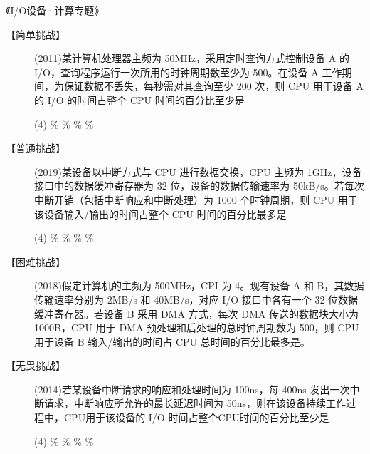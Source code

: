 \documentclass[UTF8]{ctexart}
\begin{document}
{\color{cyan!50!black}
\begin{center}
  《I/O设备·计算专题》
\end{center}


\begin{description}
  \item[【简单挑战】] (2011)某计算机处理器主频为 50MHz，采用定时查询方式控制设备 A 的 I/O，查询程序运行一次所用的时钟周期数至少为 500。在设备 A 工作期间，为保证数据不丢失，每秒需对其查询至少 200 次，则 CPU 用于设备 A 的 I/O 的时间占整个 CPU 时间的百分比至少是
  \begin{tasks}(4)
    \%
    \%
    \%
    \%
  \end{tasks}

  \item[【普通挑战】] (2019)某设备以中断方式与 CPU 进行数据交换，CPU 主频为 1GHz，设备接口中的数据缓冲寄存器为 32 位，设备的数据传输速率为 50kB/s。若每次中断开销（包括中断响应和中断处理）为 1000 个时钟周期，则 CPU 用于该设备输入/输出的时间占整个 CPU 时间的百分比最多是
  \begin{tasks}(4)
    \%
    \%
    \%
    \%
  \end{tasks}

  \item[【困难挑战】] (2018)假定计算机的主频为 500MHz，CPI 为 4。现有设备 A 和 B，其数据传输速率分别为 2MB/s 和 40MB/s，对应 I/O 接口中各有一个 32 位数据缓冲寄存器。若设备 B 采用 DMA 方式，每次 DMA 传送的数据块大小为 1000B，CPU 用于 DMA 预处理和后处理的总时钟周期数为 500，则 CPU 用于设备 B 输入/输出的时间占 CPU 总时间的百分比最多是\underline{\qquad}。

  \item[【无畏挑战】] (2014)若某设备中断请求的响应和处理时间为 100ns，每 400ns 发出一次中断请求，中断响应所允许的最长延迟时间为 50ns，则在该设备持续工作过程中，CPU用于该设备的 I/O 时间占整个CPU时间的百分比至少是
  \begin{tasks}(4)
    \%
    \%
    \%
    \%
  \end{tasks}
\end{description}

}
\end{document}
